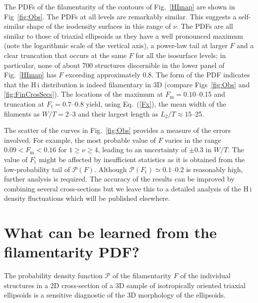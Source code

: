 \documentclass[useAMS,usenatbib]{mn2e}
\newcommand{\mx}{_\mathrm{m}}%
\newcommand{\trunc}{_\mathrm{t}}%
\begin{document}
The PDFs of the filamentarity of the contours of Fig.~\ref{HImap} are shown in
Fig~\ref{fig:Obs}. The PDFs at all levels are remarkably similar. This
suggests a self-similar shape of the isodensity surfaces in this range of
$\nu$. The PDFs are all similar to those of triaxial ellipsoids as they have a
well pronounced maximum (note the logarithmic scale of the vertical axis), a
power-law tail at larger $F$ and a clear truncation that occurs at the same
$F$ for all the isosurface levels; in particular, none of about 700 structures
discernible in the lower panel of Fig.~\ref{HImap} has $F$ exceeding
approximately 0.8. The form of the PDF indicates that the H\,{\sc i}
distribution is indeed filamentary in 3D (compare Figs~\ref{fig:Obs} and
\ref{fig:FinCrosSecs}). The locations of the maximum at $F\mx=0.10$--0.15 and
truncation at $F\trunc=0.7$--0.8 yield, using Eq.~(\ref{Fx}), the mean width
of the filaments as $W/T=2$--3 and their largest length as
$L_2/T\approx15$--25.

The scatter of the curves in Fig.~\ref{fig:Obs} provides a measure of the
errors involved. For example, the most probable value of $F$ varies in the
range $0.09<F\mx<0.16$ for $1\geq\nu\geq4$, leading to an uncertainty of
$\pm0.3$ in $W/T$. The value of $F\trunc$ might be affected by insufficient
statistics as it is obtained from the low-probability tail of
$\mathcal{P}(F)$. Although $\mathcal{P}(F\trunc)\simeq0.1\text{--}0.2$ is
reasonably high, further analysis is required. The accuracy of the results can
be improved by combining several cross-sections but we leave this to a
detailed analysis of the H\,{\sc i} density fluctuations which will be
published elsewhere.

\section{What can be learned from the filamentarity PDF?}
The probability density function $\mathcal P$ of the filamentarity $F$ of the
individual structures in a 2D cross-section of a 3D sample of isotropically
oriented triaxial ellipsoids is a sensitive diagnostic of the 3D morphology of
the ellipsoids.

\renewcommand{\theenumi}{\roman{enumi}}
\renewcommand{\labelenumi}{(\theenumi)}
\end{document}
